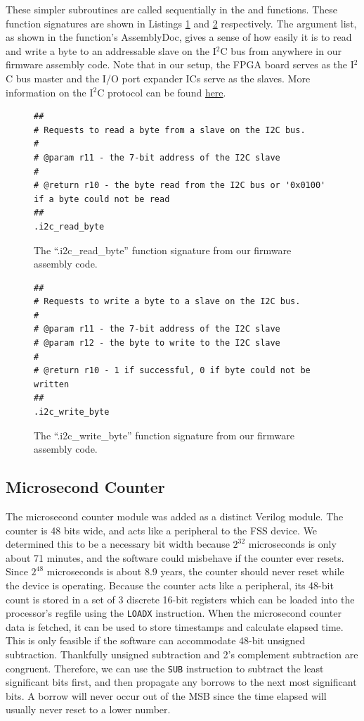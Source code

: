 \documentclass[conference]{IEEEtran}
\begin{document}
These simpler subroutines are called sequentially in the  and  functions. These function signatures are shown in Listings \ref{listing:assembly_i2c_read} and \ref{listing:assembly_i2c_write} respectively. The argument list, as shown in the function's AssemblyDoc, gives a sense of how easily it is to read and write a byte to an addressable slave on the I$^2$C bus from anywhere in our firmware assembly code. Note that in our setup, the FPGA board serves as the I$^2$C bus master and the I/O port expander ICs serve as the slaves. More information on the I$^2$C protocol can be found \href{https://en.wikipedia.org/wiki/I\%C2\%B2C}{here}.
\begin{figure}
  \begin{lstlisting}
##
# Requests to read a byte from a slave on the I2C bus.
#
# @param r11 - the 7-bit address of the I2C slave
#
# @return r10 - the byte read from the I2C bus or '0x0100' if a byte could not be read
##
.i2c_read_byte
  \end{lstlisting}
  \caption{The ``.i2c\_read\_byte'' function signature from our firmware assembly code.}
  \label{listing:assembly_i2c_read}
\end{figure}
\begin{figure}
  \begin{lstlisting}
##
# Requests to write a byte to a slave on the I2C bus.
#
# @param r11 - the 7-bit address of the I2C slave
# @param r12 - the byte to write to the I2C slave
#
# @return r10 - 1 if successful, 0 if byte could not be written
##
.i2c_write_byte
  \end{lstlisting}
  \caption{The ``.i2c\_write\_byte'' function signature from our firmware assembly code.}
  \label{listing:assembly_i2c_write}
\end{figure}

\subsection{Microsecond Counter}
The microsecond counter module was added as a distinct Verilog module. The counter is 48 bits wide, and acts like a peripheral to the FSS device. We determined this to be a necessary bit width because $2^{32}$ microseconds is only about 71 minutes, and the software could misbehave if the counter ever resets. Since $2^{48}$ microseconds is about 8.9 years, the counter should never reset while the device is operating. Because the counter acts like a peripheral, its 48-bit count is stored in a set of 3 discrete 16-bit registers which can be loaded into the processor's regfile using the \verb|LOADX| instruction. When the microsecond counter data is fetched, it can be used to store timestamps and calculate elapsed time. This is only feasible if the software can accommodate 48-bit unsigned subtraction. Thankfully unsigned subtraction and 2's complement subtraction are congruent. Therefore, we can use the \verb|SUB| instruction to subtract the least significant bits first, and then propagate any borrows to the next most significant bits. A borrow will never occur out of the MSB since the time elapsed will usually never reset to a lower number.
\end{document}
